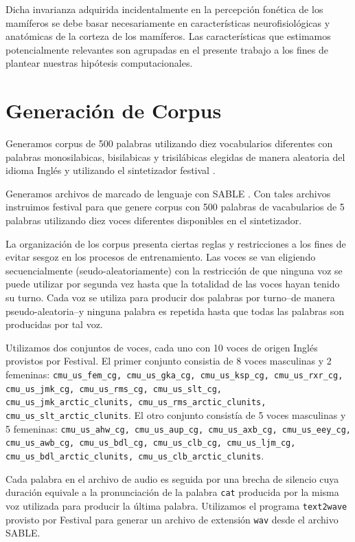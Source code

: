 Dicha invarianza adquirida incidentalmente en la percepción fonética de los mamíferos se debe basar necesariamente en características neurofisiológicas y anatómicas de la corteza de los mamíferos. Las características que estimamos potencialmente relevantes son agrupadas en el presente trabajo a los fines de plantear nuestras hipótesis computacionales.

\section{Generación de Corpus}
\label{CorpGen}

Generamos corpus de 500 palabras utilizando diez vocabularios diferentes con palabras monosilabicas, bisilabicas y trisilábicas elegidas de manera aleatoria del idioma Inglés y utilizando el sintetizador \gls{festival} \cite{festival2014}.


Generamos archivos de marcado de lenguaje con SABLE \cite{sable}. Con tales archivos instruimos \gls{festival} para que genere corpus con 500  palabras de vacabularios de 5 palabras utilizando diez voces diferentes disponibles en el sintetizador.

La organización de los corpus presenta ciertas reglas y restricciones a los fines de evitar sesgoz en los procesos de entrenamiento. Las voces se van eligiendo secuencialmente (seudo-aleatoriamente) con la restricción de que ninguna voz se puede utilizar por segunda vez hasta que la totalidad de las voces hayan tenido su turno. Cada voz se utiliza para producir dos palabras por turno--de manera pseudo-aleatoria--y ninguna palabra es repetida hasta que todas las palabras son producidas por tal voz.


Utilizamos dos conjuntos de voces, cada uno con 10 voces de origen Inglés provistos por Festival. El primer conjunto consistia de 8 voces masculinas y 2 femeninas: \texttt{cmu\_us\_fem\_cg, cmu\_us\_gka\_cg, cmu\_us\_ksp\_cg, cmu\_us\_rxr\_cg, cmu\_us\_jmk\_cg, cmu\_us\_rms\_cg, cmu\_us\_slt\_cg, cmu\_us\_jmk\_arctic\_clunits, cmu\_us\_rms\_arctic\_clunits, cmu\_us\_slt\_arctic\_clunits}. El otro conjunto consistía de 5 voces masculinas y 5 femeninas: \texttt{cmu\_us\_ahw\_cg, cmu\_us\_aup\_cg, cmu\_us\_axb\_cg, cmu\_us\_eey\_cg, cmu\_us\_awb\_cg, cmu\_us\_bdl\_cg, cmu\_us\_clb\_cg, cmu\_us\_ljm\_cg, cmu\_us\_bdl\_arctic\_clunits, cmu\_us\_clb\_arctic\_clunits}.

Cada palabra en el archivo de audio es seguida por una brecha de silencio cuya duración equivale a la pronunciación de la palabra \texttt{cat} producida por la misma voz utilizada para producir la última palabra. Utilizamos el programa \texttt{text2wave} provisto por Festival para generar un archivo de extensión \texttt{wav} desde el archivo SABLE.

